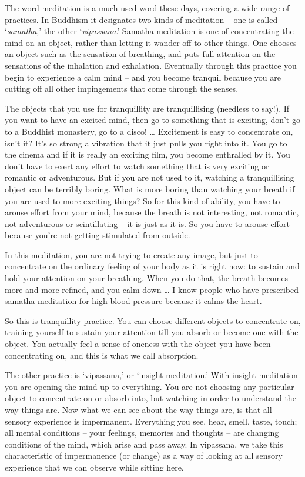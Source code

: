 
The word meditation is a much used word these days, covering a wide range of practices. In Buddhism it designates two kinds of meditation -- one is called `\textit{samatha},' the other `\textit{vipassanā}.' Samatha meditation is one of concentrating the mind on an object, rather than letting it wander off to other things. One chooses an object such as the sensation of breathing, and puts full attention on the sensations of the inhalation and exhalation. Eventually through this practice you begin to experience a calm mind -- and you become tranquil because you are cutting off all other impingements that come through the senses.

The objects that you use for tranquillity are tranquillising (needless to say!). If you want to have an excited mind, then go to something that is exciting, don't go to a Buddhist monastery, go to a disco! \ldots{} Excitement is easy to concentrate on, isn't it? It's so strong a vibration that it just pulls you right into it. You go to the cinema and if it is really an exciting film, you become enthralled by it. You don't have to exert any effort to watch something that is very exciting or romantic or adventurous. But if you are not used to it, watching a tranquillising object can be terribly boring. What is more boring than watching your breath if you are used to more exciting things? So for this kind of ability, you have to arouse effort from your mind, because the breath is not interesting, not romantic, not adventurous or scintillating -- it is just as it is. So you have to arouse effort because you're not getting stimulated from outside.

In this meditation, you are not trying to create any image, but just to concentrate on the ordinary feeling of your body as it is right now: to sustain and hold your attention on your breathing. When you do that, the breath becomes more and more refined, and you calm down \ldots{} I know people who have prescribed samatha meditation for high blood pressure because it calms the heart.

So this is tranquillity practice. You can choose different objects to concentrate on, training yourself to sustain your attention till you absorb or become one with the object. You actually feel a sense of oneness with the object you have been concentrating on, and this is what we call absorption.

The other practice is `vipassana,' or `insight meditation.' With insight meditation you are opening the mind up to everything. You are not choosing any particular object to concentrate on or absorb into, but watching in order to understand the way things are. Now what we can see about the way things are, is that all sensory experience is impermanent. Everything you see, hear, smell, taste, touch; all mental conditions -- your feelings, memories and thoughts -- are changing conditions of the mind, which arise and pass away. In vipassana, we take this characteristic of impermanence (or change) as a way of looking at all sensory experience that we can observe while sitting here.


